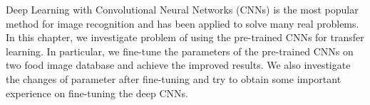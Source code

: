 Deep Learning with Convolutional Neural Networks (CNNs) is the most popular method for image recognition and has been applied to solve many real problems. In this chapter, we investigate problem of using the pre-trained CNNs for transfer learning. In particular, we fine-tune the parameters of the pre-trained CNNs on two food image database and achieve the improved results. We also investigate the changes of parameter after fine-tuning and try to obtain some important experience on fine-tuning the deep CNNs.
 

